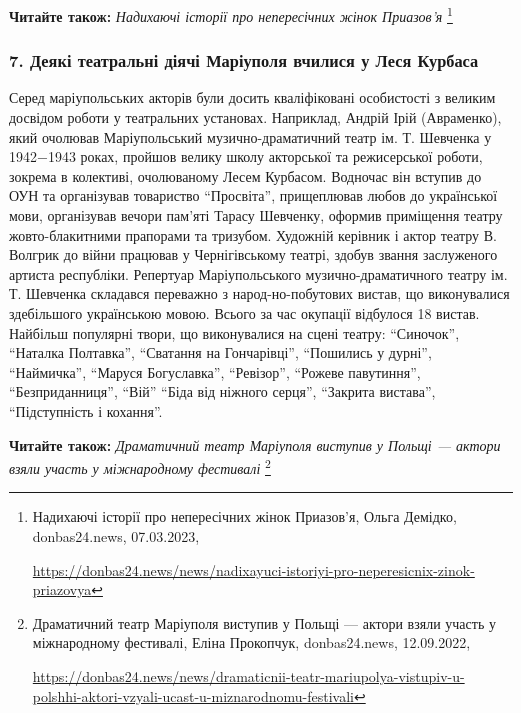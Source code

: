 \textbf{Читайте також:} \emph{Надихаючі історії про непересічних жінок Приазов'я}%
\footnote{Надихаючі історії про непересічних жінок Приазов'я, Ольга Демідко, donbas24.news, 07.03.2023, \par%
\url{https://donbas24.news/news/nadixayuci-istoriyi-pro-neperesicnix-zinok-priazovya}%
}


\subsubsection{7. Деякі театральні діячі Маріуполя вчилися у Леся Курбаса}

Серед маріупольських акторів були досить кваліфіковані особистості з великим
досвідом роботи у театральних установах. Наприклад, Андрій Ірій (Авраменко),
який очолював Маріупольський музично-драматичний театр ім. Т. Шевченка у
1942−1943 роках, пройшов велику школу акторської та режисерської роботи,
зокрема в колективі, очолюваному Лесем Курбасом. Водночас він вступив до ОУН та
організував товариство \enquote{Просвіта}, прищеплював любов до української мови,
організував вечори пам'яті Тарасу Шевченку, оформив приміщення театру
жовто-блакитними прапорами та тризубом. Художній керівник і актор театру В.
Волгрик до війни працював у Чернігівському театрі, здобув звання заслуженого
артиста республіки. Репертуар Маріупольського музично-драматичного театру ім.
Т. Шевченка складався переважно з народ\hyp{}но-побутових вистав, що виконувалися
здебільшого українською мовою. Всього за час окупації відбулося 18 вистав.
Найбільш популярні твори, що виконувалися на сцені театру: \enquote{Синочок}, \enquote{Наталка
Полтавка}, \enquote{Сватання на Гончарівці}, \enquote{Пошились у дурні}, \enquote{Наймичка}, \enquote{Маруся
Богуславка}, \enquote{Ревізор}, \enquote{Рожеве павутиння}, \enquote{Безприданниця}, \enquote{Вій} \enquote{Біда від
ніжного серця}, \enquote{Закрита вистава}, \enquote{Підступність і кохання}.

\textbf{Читайте також:} \emph{Драматичний театр Маріуполя виступив у Польщі — актори взяли участь у міжнародному фестивалі}%
\footnote{Драматичний театр Маріуполя виступив у Польщі — актори взяли участь у міжнародному фестивалі, Еліна Прокопчук, donbas24.news, 12.09.2022, \par%
\url{https://donbas24.news/news/dramaticnii-teatr-mariupolya-vistupiv-u-polshhi-aktori-vzyali-ucast-u-miznarodnomu-festivali}%
}

